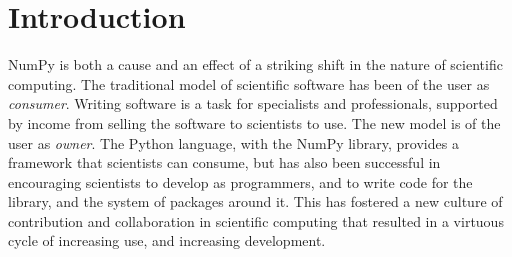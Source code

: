 \section{Introduction}





NumPy is both a cause and an effect of a striking shift in the nature of
scientific computing.  The traditional model of scientific software has been of
the user as {\it consumer}.  Writing software is a task for specialists and
professionals, supported by income from selling the software to scientists to
use.  The new model is of the user as {\it owner}.  The Python language, with
the NumPy library, provides a framework that scientists can consume, but has
also been successful in encouraging scientists to develop as programmers, and
to write code for the library, and the system of packages around it.  This has
fostered a new culture of contribution and collaboration in scientific
computing that resulted in a virtuous cycle of increasing use, and increasing
development.

